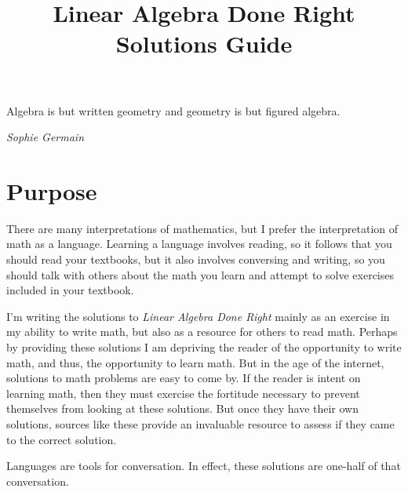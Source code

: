 \documentclass{article}
\title{Linear Algebra Done Right\\Solutions Guide}
\author{}
\date{}
\begin{document}
\maketitle

\epigraph{Algebra is but written geometry and geometry is but figured algebra.}{\textit{Sophie Germain}}

\section{Purpose}
There are many interpretations of mathematics, but I prefer the interpretation of math as a language. Learning a language involves reading, so it follows that you should read your textbooks, but it also involves conversing and writing, so you should talk with others about the math you learn and attempt to solve exercises included in your textbook.

I'm writing the solutions to \textit{Linear Algebra Done Right} mainly as an exercise in my ability to write math, but also as a resource for others to read math. Perhaps by providing these solutions I am depriving the reader of the opportunity to write math, and thus, the opportunity to learn math. But in the age of the internet, solutions to math problems are easy to come by. If the reader is intent on learning math, then they must exercise the fortitude necessary to prevent themselves from looking at these solutions. But once they have their own solutions, sources like these provide an invaluable resource to assess if they came to the correct solution.

Languages are tools for conversation. In effect, these solutions are one-half of that conversation.
\end{document}

